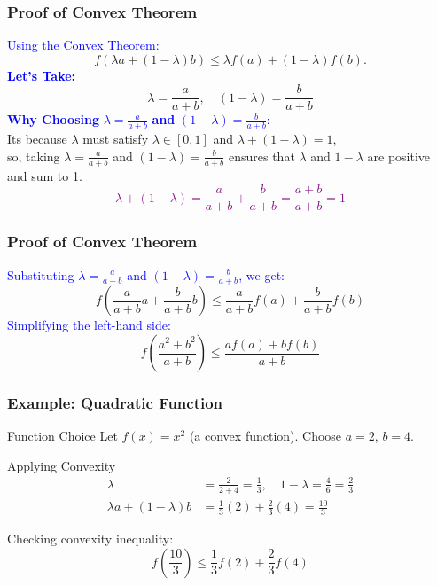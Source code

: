 \begin{frame}
\frametitle{Proof of Convex Theorem}
    \textcolor{blue}{Using the Convex Theorem: }
    \[ f (\lambda a + (1 − \lambda)b) \leq \lambda f (a) + (1 − \lambda)f (b).
    \]
    \textcolor{blue}{\textbf{Let's Take:}}
    \[
        \lambda = \frac{a}{a+b}, \quad (1-\lambda) = \frac{b}{a+b}
    \]
    \textcolor{blue}{\textbf{Why Choosing} \( \lambda = \frac{a}{a+b} \) \textbf{and} \( (1-\lambda) = \frac{b}{a+b} \):} \\
    \vspace{10pt} 
    Its because \( \lambda \) must satisfy \( \lambda \in [0,1] \) and \( \lambda + (1−\lambda) = 1 \), \\
    \vspace{10pt} 
    so, taking \( \lambda = \frac{a}{a+b} \) and \( (1-\lambda) = \frac{b}{a+b} \) ensures that \( \lambda \) 
    and \( 1−\lambda \) are positive and sum to 1. \\
    \textcolor{purple}{\[
    \lambda + (1-\lambda) = \frac{a}{a+b} + \frac{b}{a+b} = \frac{a+b}{a+b} = 1
    \]}

\end{frame}

\begin{frame}
\frametitle{Proof of Convex Theorem}

    \textcolor{blue}{Substituting \( \lambda = \frac{a}{a+b} \) and \( (1-\lambda) = \frac{b}{a+b} \), we get:}
    \[
    f \left( \frac{a}{a+b} a + \frac{b}{a+b} b \right) \leq \frac{a}{a+b} f(a) + \frac{b}{a+b} f(b)
    \]
    \textcolor{blue}{Simplifying the left-hand side:}
    \[
    f \left( \frac{a^2+b^2}{a+b} \right) \leq \frac{a f(a) + b f(b)}{a+b}
    \]
\end{frame}

\begin{frame}
\frametitle{Example: Quadratic Function}
\begin{block}{Function Choice}
    Let \( f(x) = x^2 \) (a convex function). Choose \( a = 2 \), \( b = 4 \).
\end{block}

\begin{block}{Applying Convexity}
    \begin{align*}
    \lambda &= \frac{2}{2+4} = \frac{1}{3}, \quad 1 - \lambda = \frac{4}{6} = \frac{2}{3} \\
    \lambda a + (1-\lambda)b &= \frac{1}{3} (2) + \frac{2}{3} (4) = \frac{10}{3}
    \end{align*}
    
    Checking convexity inequality:
    \[ f\left(\frac{10}{3}\right) \leq \frac{1}{3} f(2) + \frac{2}{3} f(4) \]
\end{block}
\end{frame}

